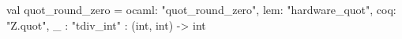 val quot_round_zero = {ocaml: "quot_round_zero", lem: "hardware_quot", coq: "Z.quot", _ : "tdiv_int"} : (int, int) -> int
